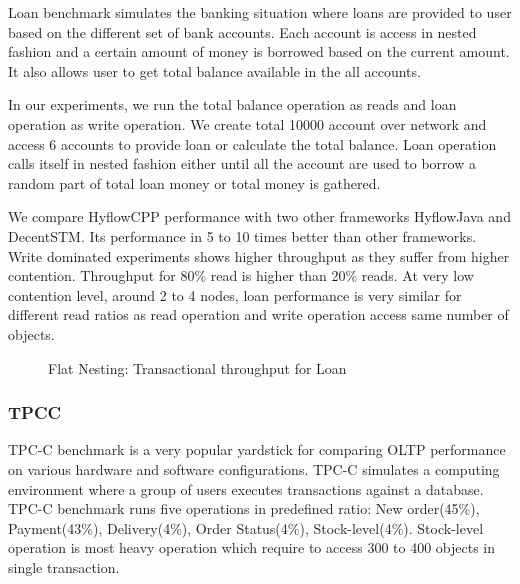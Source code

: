 \documentclass[12pt,english]{report}
\begin{document}
Loan benchmark simulates the banking situation where loans are provided to user based on the different set of bank accounts. Each account is access in nested fashion and a certain amount of money is borrowed based on the current amount. It also allows user to get total balance available in the all accounts.

In our experiments, we run the total balance operation as reads and loan operation as write operation. We create total 10000 account over network and access 6 accounts to provide loan or calculate the total balance.
Loan operation calls itself in nested fashion either until all the account are used to borrow a random part of total loan money or total money is gathered.

We compare HyflowCPP performance with two other frameworks HyflowJava and DecentSTM. Its performance in 5 to 10 times better than other frameworks. Write dominated experiments shows higher throughput as they suffer from higher contention. Throughput for 80\% read is higher than 20\% reads. At very low contention level, around 2 to 4 nodes, loan performance is very similar for different read ratios as read operation and write operation access same number of objects. 

\begin{figure}[H]
\centering
{}
\end{figure}
\begin{figure}[H]
\centering
{}
\end{figure}

\begin{figure}[H]
\centering
{}
\caption{Flat Nesting: Transactional throughput for Loan}
\label{Fig:flatLoan}
\end{figure}

\subsubsection{TPCC}

TPC-C benchmark is a very popular yardstick for comparing OLTP performance on various hardware and software configurations. TPC-C simulates a computing environment where a group of users executes transactions against a database. TPC-C benchmark runs five operations in predefined ratio: New order(45\%), Payment(43\%), Delivery(4\%), Order Status(4\%), Stock-level(4\%). Stock-level operation is most heavy operation which require to access 300 to 400 objects in single transaction. 
\end{document}
